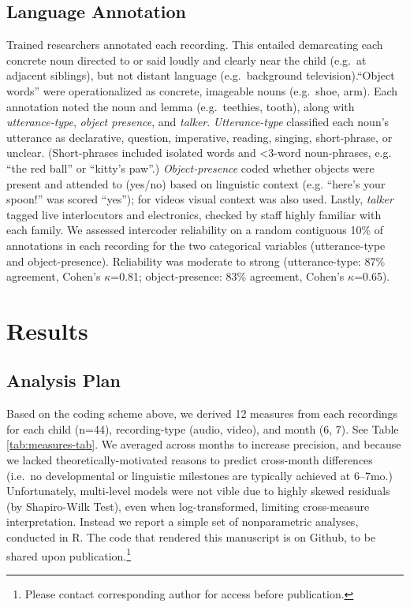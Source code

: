\documentclass[man]{apa6}
\theoremstyle{definition}
\theoremstyle{definition}
\theoremstyle{definition}
\theoremstyle{remark}
\begin{document}
\subsection{Language Annotation}\label{language-annotation}

Trained researchers annotated each recording. This entailed demarcating
each concrete noun directed to or said loudly and clearly near the child
(e.g.~at adjacent siblings), but not distant language (e.g.~background
television).\enquote{Object words} were operationalized as concrete,
imageable nouns (e.g.~shoe, arm). Each annotation noted the noun and
lemma (e.g.~teethies, tooth), along with \emph{utterance-type},
\emph{object presence}, and \emph{talker}. \emph{Utterance-type}
classified each noun's utterance as declarative, question, imperative,
reading, singing, short-phrase, or unclear. (Short-phrases included
isolated words and \textless{}3-word noun-phrases, e.g. \enquote{the red
ball} or \enquote{kitty's paw}.) \emph{Object-presence} coded whether
objects were present and attended to (yes/no) based on linguistic
context (e.g. \enquote{here's your spoon!} was scored \enquote{yes});
for videos visual context was also used. Lastly, \emph{talker} tagged
live interlocutors and electronics, checked by staff highly familiar
with each family. We assessed intercoder reliability on a random
contiguous 10\% of annotations in each recording for the two categorical
variables (utterance-type and object-presence). Reliability was moderate
to strong (utterance-type: 87\% agreement, Cohen's \(\kappa\)=0.81;
object-presence: 83\% agreement, Cohen's \(\kappa\)=0.65).

\section{Results}\label{results}

\subsection{Analysis Plan}\label{analysis-plan}

Based on the coding scheme above, we derived 12 measures from each
recordings for each child (n=44), recording-type (audio, video), and
month (6, 7). See Table \ref{tab:measures-tab}. We averaged across
months to increase precision, and because we lacked
theoretically-motivated reasons to predict cross-month differences
(i.e.~no developmental or linguistic milestones are typically achieved
at 6--7mo.) Unfortunately, multi-level models were not vible due to
highly skewed residuals (by Shapiro-Wilk Test), even when
log-transformed, limiting cross-measure interpretation. Instead we
report a simple set of nonparametric analyses, conducted in R. The code
that rendered this manuscript is on Github, to be shared upon
publication.\footnote{Please contact corresponding author for access before publication.}
\end{document}
